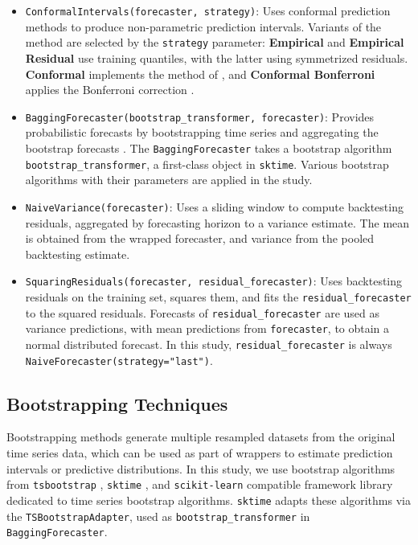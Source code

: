 \begin{itemize}
    \item \texttt{ConformalIntervals(forecaster, strategy)}: Uses conformal prediction methods \cite{Stankeviciute2021} to produce non-parametric prediction intervals. Variants of the method are selected by the \texttt{strategy} parameter: \textbf{Empirical} and \textbf{Empirical Residual} use training quantiles, with the latter using symmetrized residuals. \textbf{Conformal} implements the method of \cite{Stankeviciute2021}, and \textbf{Conformal Bonferroni} applies the Bonferroni correction \citep{Sedgwicke509} .
    \item \texttt{BaggingForecaster(bootstrap\_transformer, forecaster)}: Provides probabilistic forecasts by bootstrapping time series and aggregating the bootstrap forecasts \citep{hyndman2018, bergmeir2016}. The \texttt{BaggingForecaster} takes a bootstrap algorithm \texttt{bootstrap\_transformer}, a first-class object in \texttt{sktime}. Various bootstrap algorithms with their parameters are applied in the study.
    \item \texttt{NaiveVariance(forecaster)}: Uses a sliding window to compute backtesting residuals, aggregated by forecasting horizon to a variance estimate. The mean is obtained from the wrapped forecaster, and variance from the pooled backtesting estimate.
    \item \texttt{SquaringResiduals(forecaster, residual\_forecaster)}: Uses backtesting residuals on the training set, squares them, and fits the \texttt{residual\_forecaster} to the squared residuals. Forecasts of \texttt{residual\_forecaster} are used as variance predictions, with mean predictions from \texttt{forecaster}, to obtain a normal distributed forecast. In this study, \texttt{residual\_forecaster} is always \texttt{NaiveForecaster(strategy="last")}.
\end{itemize}

\subsection{Bootstrapping Techniques}
Bootstrapping methods generate multiple resampled datasets from the original time series data, which can be used as part of wrappers to estimate prediction intervals or predictive distributions. In this study, we use bootstrap algorithms from \texttt{tsbootstrap} \citep{gilda2024tsbootstrap, gilda_2024_10866090_tsbootstrap}, \texttt{sktime} \citep{franz_kiraly_2024_11095261_sktime}, and \texttt{scikit-learn} \citep{pedregosa2011scikit} compatible framework library dedicated to time series bootstrap algorithms. \texttt{sktime} adapts these algorithms via the \texttt{TSBootstrapAdapter}, used as \texttt{bootstrap\_transformer} in \texttt{BaggingForecaster}.

